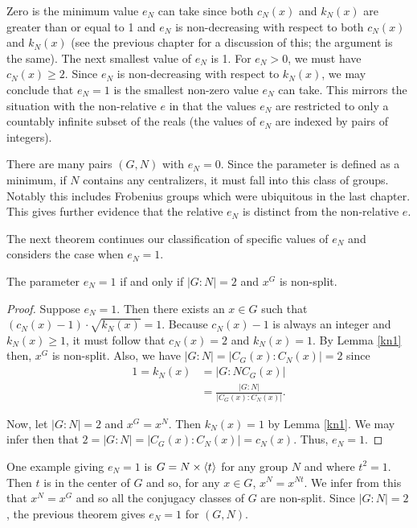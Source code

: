 \documentclass[main.tex]{subfiles}
\begin{document}
Zero is the minimum value $e_N$ can take since both $c_N(x)$ and $k_N(x)$ are greater than or equal to 1 and $e_N$ is non-decreasing with respect to both $c_N(x)$ and $k_N(x)$ (see the previous chapter for a discussion of this; the argument is the same). The next smallest value of $e_N$ is 1. For $e_N > 0$, we must have $c_N(x) \ge 2$. Since $e_N$ is non-decreasing with respect to $k_N(x)$, we may conclude that $e_N = 1$ is the smallest non-zero value $e_N$ can take. This mirrors the situation with the non-relative $e$ in that the values $e_N$ are restricted to only a countably infinite subset of the reals (the values of $e_N$ are indexed by pairs of integers).

There are many pairs $(G, N)$ with $e_N = 0$. Since the parameter is defined as a minimum, if $N$ contains any centralizers, it must fall into this class of groups. Notably this includes Frobenius groups which were ubiquitous in the last chapter. This gives further evidence that the relative $e_N$ is distinct from the non-relative $e$.

The next theorem continues our classification of specific values of $e_N$ and considers the case when $e_N = 1$.

\begin{theorem}\label{en1}
The parameter $e_N = 1$ if and only if $|G:N| = 2$ and $x^G$ is non-split.
\end{theorem}

\begin{proof}
Suppose $e_N = 1$. Then there exists an $x \in G$ such that $(c_N(x) - 1) \cdot \sqrt{k_N(x)} = 1$. Because $c_N(x) - 1$ is always an integer and $k_N(x) \ge 1$, it must follow that $c_N(x) = 2$ and $k_N(x) = 1$. By Lemma \ref{kn1} then, $x^G$ is non-split. Also, we have $|G : N| = |C_G(x) : C_N(x)| = 2$ since
\begin{align*}
1 = k_N(x) &= |G : NC_G(x)| \\
&= \frac{|G : N|}{|C_G(x) : C_N(x)|} \text{.}
\end{align*}

Now, let $|G:N| = 2$ and $x^G = x^N$. Then $k_N(x) = 1$ by Lemma \ref{kn1}. We may infer then that $2 = |G : N| = |C_G(x) : C_N(x)| = c_N(x)$. Thus, $e_N = 1$. 
\end{proof}

One example giving $e_N = 1$ is $G = N \times \langle t \rangle$ for any group $N$ and where $t^2 = 1$. Then $t$ is in the center of $G$ and so, for any $x \in G$, $x^N = x^{Nt}$. We infer from this that $x^N = x^G$ and so all the conjugacy classes of $G$ are non-split. Since $|G : N| = 2$, the previous theorem gives $e_N = 1$ for $(G, N)$.
\end{document}
